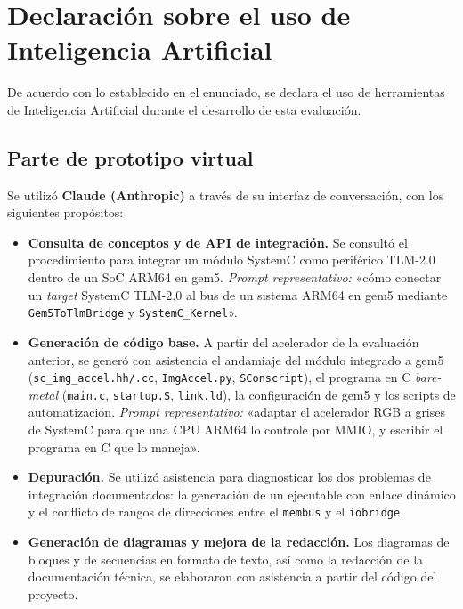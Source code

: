 \documentclass[11pt,letterpaper]{article}
\begin{document}
\newpage
\section*{Declaración sobre el uso de Inteligencia Artificial}

De acuerdo con lo establecido en el enunciado, se declara el uso de herramientas
de Inteligencia Artificial durante el desarrollo de esta evaluación.

\subsection*{Parte de prototipo virtual}

Se utilizó \textbf{Claude (Anthropic)} a través de su interfaz de conversación,
con los siguientes propósitos:

\begin{itemize}[leftmargin=*,itemsep=3pt]
  \item \textbf{Consulta de conceptos y de API de integración.} Se consultó el
        procedimiento para integrar un módulo SystemC como periférico TLM-2.0
        dentro de un SoC ARM64 en gem5.
        \emph{Prompt representativo:} «cómo conectar un \emph{target} SystemC
        TLM-2.0 al bus de un sistema ARM64 en gem5 mediante
        \texttt{Gem5ToTlmBridge} y \texttt{SystemC\_Kernel}».

  \item \textbf{Generación de código base.} A partir del acelerador de la
        evaluación anterior, se generó con asistencia el andamiaje del módulo
        integrado a gem5 (\texttt{sc\_img\_accel.hh/.cc}, \texttt{ImgAccel.py},
        \texttt{SConscript}), el programa en C \emph{bare-metal}
        (\texttt{main.c}, \texttt{startup.S}, \texttt{link.ld}), la
        configuración de gem5 y los scripts de automatización.
        \emph{Prompt representativo:} «adaptar el acelerador RGB a grises de
        SystemC para que una CPU ARM64 lo controle por MMIO, y escribir el
        programa en C que lo maneja».

  \item \textbf{Depuración.} Se utilizó asistencia para diagnosticar los dos
        problemas de integración documentados: la generación de un ejecutable
        con enlace dinámico y el conflicto de rangos de direcciones entre el
        \texttt{membus} y el \texttt{iobridge}.

  \item \textbf{Generación de diagramas y mejora de la redacción.} Los diagramas
        de bloques y de secuencias en formato de texto, así como la redacción de
        la documentación técnica, se elaboraron con asistencia a partir del
        código del proyecto.
\end{itemize}
\end{document}
